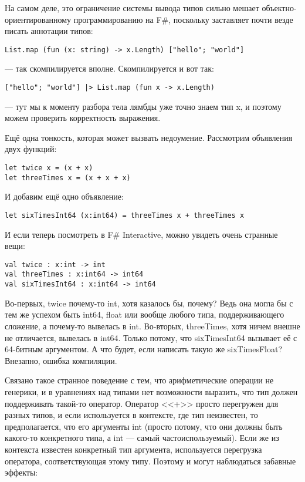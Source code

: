 \documentclass[a5paper]{article}
\begin{document}
На самом деле, это ограничение системы вывода типов сильно мешает объектно-ориентированному программированию на F\#, поскольку заставляет почти везде писать аннотации типов:

\begin{verbatim}
List.map (fun (x: string) -> x.Length) ["hello"; "world"] 
\end{verbatim}

--- так скомпилируется вполне. Скомпилируется и вот так:

\begin{verbatim}
["hello"; "world"] |> List.map (fun x -> x.Length)  
\end{verbatim}

--- тут мы к моменту разбора тела лямбды уже точно знаем тип x, и поэтому можем проверить корректность выражения.

Ещё одна тонкость, которая может вызвать недоумение. Рассмотрим объявления двух функций:

\begin{verbatim}
let twice x = (x + x)
let threeTimes x = (x + x + x)
\end{verbatim}

И добавим ещё одно объявление:

\begin{verbatim}
let sixTimesInt64 (x:int64) = threeTimes x + threeTimes x
\end{verbatim}

И если теперь посмотреть в F\# Interactive, можно увидеть очень странные вещи:

\begin{verbatim}
val twice : x:int -> int
val threeTimes : x:int64 -> int64
val sixTimesInt64 : x:int64 -> int64
\end{verbatim}

Во-первых, twice почему-то int, хотя казалось бы, почему? Ведь она могла бы с тем же успехом быть int64, float или вообще любого типа, поддерживающего сложение, а почему-то вывелась в int. Во-вторых, threeTimes, хотя ничем внешне не отличается, вывелась в int64. Только потому, что sixTimesInt64 вызывает её с 64-битным аргументом. А что будет, если написать такую же sixTimesFloat? Внезапно, ошибка компиляции.

Связано такое странное поведение с тем, что арифметические операции не генерики, и в уравнениях над типами нет возможности выразить, что тип должен поддерживать такой-то оператор. Оператор <<+>> просто перегружен для разных типов, и если используется в контексте, где тип неизвестен, то предполагается, что его аргументы int (просто потому, что они должны быть какого-то конкретного типа, а int --- самый частоиспользуемый). Если же из контекста известен конкретный тип аргумента, используется перегрузка оператора, соответствующая этому типу. Поэтому и могут наблюдаться забавные эффекты:
\end{document}
